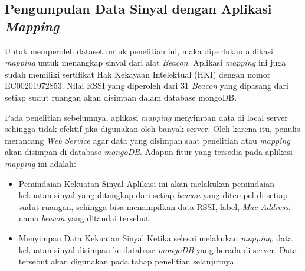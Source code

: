 \subsection{Pengumpulan Data Sinyal dengan Aplikasi \textit{Mapping}}
\par Untuk memperoleh dataset untuk penelitian ini, maka diperlukan aplikasi \textit{mapping} untuk menangkap sinyal  dari alat \textit{Beacon}. Aplikasi \textit{mapping} ini juga sudah memiliki sertifikat Hak Kekayaan Intelektual (HKI) dengan nomor EC00201972853. Nilai RSSI yang diperoleh dari 31 \textit{Beacon} yang dipasang dari setiap sudut ruangan akan disimpan dalam database mongoDB.
\par Pada penelitian sebelumnya, aplikasi \textit{mapping} menyimpan data di local server sehingga  tidak efektif jika digunakan oleh banyak server. Oleh karena itu, penulis merancang \textit{Web Service} agar data yang disimpan saat penelitian atau \textit{mapping} akan disimpan di database \textit{mongoDB}. Adapun fitur yang tersedia pada aplikasi \textit{mapping} ini adalah:

\begin {itemize}
\itemsep0em
\item Pemindaian Kekuatan Sinyal \newline
Aplikasi ini akan melakukan pemindaian kekuatan sinyal yang ditangkap dari setiap \textit{beacon} yang ditempel di setiap sudut ruangan, sehingga bisa menampilkan data RSSI, label, \textit{Mac Address}, nama \textit{beacon} yang ditandai tersebut.

\item Menyimpan Data Kekuatan Sinyal \newline
Ketika selesai melakukan \textit{mapping}, data kekuatan sinyal disimpan ke database \textit{mongoDB} yang berada di server. Data tersebut akan digunakan pada tahap penelitian selanjutnya.
\end{itemize}


